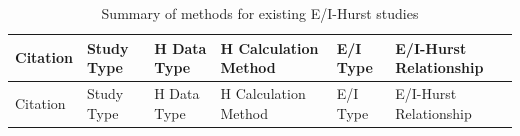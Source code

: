 \documentclass[
true
]{sn-jnl}
\begin{document}
\begin{longtable}[]{@{}
  >{\raggedright\arraybackslash}p{}
  >{\raggedright\arraybackslash}p{}
  >{\raggedright\arraybackslash}p{}
  >{\raggedright\arraybackslash}p{}
  >{\raggedright\arraybackslash}p{}
  >{\raggedright\arraybackslash}p{}@{}}
\caption{Summary of methods for existing E/I-Hurst
studies}\label{tbl-lit}\tabularnewline
\toprule\noalign{}
\begin{minipage}[b]{\linewidth}\raggedright
Citation
\end{minipage} & \begin{minipage}[b]{\linewidth}\raggedright
Study Type
\end{minipage} & \begin{minipage}[b]{\linewidth}\raggedright
H Data Type
\end{minipage} & \begin{minipage}[b]{\linewidth}\raggedright
H Calculation Method
\end{minipage} & \begin{minipage}[b]{\linewidth}\raggedright
E/I Type
\end{minipage} & \begin{minipage}[b]{\linewidth}\raggedright
E/I-Hurst Relationship
\end{minipage} \\
\midrule\noalign{}
\endfirsthead
\toprule\noalign{}
\begin{minipage}[b]{\linewidth}\raggedright
Citation
\end{minipage} & \begin{minipage}[b]{\linewidth}\raggedright
Study Type
\end{minipage} & \begin{minipage}[b]{\linewidth}\raggedright
H Data Type
\end{minipage} & \begin{minipage}[b]{\linewidth}\raggedright
H Calculation Method
\end{minipage} & \begin{minipage}[b]{\linewidth}\raggedright
E/I Type
\end{minipage} & \begin{minipage}[b]{\linewidth}\raggedright
E/I-Hurst Relationship
\end{minipage} \\

\end{longtable}
\end{document}
